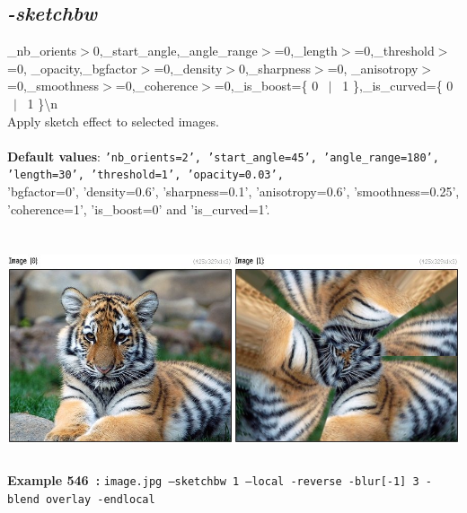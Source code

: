 \documentclass[a4paper,11pt,twoside]{book}
\begin{document}
\subsection{\emph{-sketchbw} }\vspace*{-0.5em}
\_nb\_orients$>$0,\_start\_angle,\_angle\_range$>$=0,\_length$>$=0,\_threshold$>$=0,
\_opacity,\_bgfactor$>$=0,\_density$>$0,\_sharpness$>$=0,
\_anisotropy$>$=0,\_smoothness$>$=0,\_coherence$>$=0,\_is\_boost=\{ 0 ~$|$~ 1 \},\_is\_curved=\{ 0 ~$|$~ 1 \}\textbackslash n
~\\Apply sketch effect to selected images.
~\\~\\\textbf{Default values}: {\small \texttt{'nb\_orients=2', 'start\_angle=45', 'angle\_range=180', 'length=30', 'threshold=1', 'opacity=0.03',}}
~\\'bgfactor=0', 'density=0.6', 'sharpness=0.1', 'anisotropy=0.6', 'smoothness=0.25', 'coherence=1', 'is\_boost=0' and 'is\_curved=1'.
\begin{center}\includegraphics[keepaspectratio=true,height=7cm,width=\textwidth]{img/gmic_def546.jpg}\\
{\footnotesize \textbf{Example 546~:} \texttt{image.jpg --sketchbw 1 --local -reverse -blur[-1] 3 -blend overlay -endlocal}}
\end{center}
\end{document}
